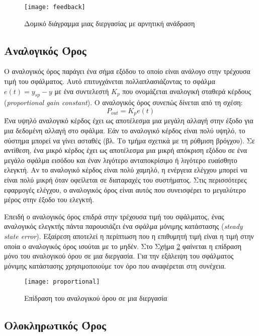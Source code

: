 \begin{figure}[h]
  \centering
  \texttt{[image: feedback]}
  \caption{Δομικό διάγραμμα μιας διεργασίας με αρνητική ανάδραση}
  \label{fig:feedback}
\end{figure}

\subsection{Αναλογικός Όρος} \label{subsec:proportional_control}

Ο αναλογικός όρος παράγει ένα σήμα εξόδου το οποίο είναι ανάλογο στην τρέχουσα τιμή του σφάλματος. Αυτό επιτυγχάνεται πολλαπλασιάζοντας το σφάλμα $e(t)=y_{sp}-y$ με ένα συντελεστή $K_p$ που ονομάζεται αναλογική σταθερά κέρδους (\emph{proportional gain constant}). Ο αναλογικός όρος συνεπώς δίνεται από τη σχέση:
\begin{equation}
P_{out}=K_p e(t)
\label{eq:p_out}
\end{equation}
Ένα υψηλό αναλογικό κέρδος έχει ως αποτέλεσμα μια μεγάλη αλλαγή στην έξοδο για μια δεδομένη αλλαγή στο σφάλμα. Εάν το αναλογικό κέρδος είναι πολύ υψηλό, το σύστημα μπορεί να γίνει ασταθές (βλ. Το τμήμα σχετικά με τη ρύθμιση βρόγχου). Σε αντίθεση, ένα μικρό κέρδος έχει ως αποτέλεσμα μια μικρή απόκριση εξόδου σε ένα μεγάλο σφάλμα εισόδου και έναν λιγότερο ανταποκρίσιμο ή λιγότερο ευαίσθητο ελεγκτή. Αν το αναλογικό κέρδος είναι πολύ χαμηλό, η ενέργεια ελέγχου μπορεί να είναι πολύ μικρή όταν οφείλεται σε διαταραχές του συστήματος. Στις περισσότερες εφαρμογές ελέγχου, ο αναλογικός όρος είναι αυτός που συνεισφέρει το μεγαλύτερο μέρος στην έξοδο του ελεγκτή.

Επειδή ο αναλογικός όρος επιδρά στην τρέχουσα τιμή του σφάλματος, ένας αναλογικός ελεγκτής πάντα παρουσιάζει ένα σφάλμα μόνιμης κατάστασης (\emph{steady state error}). Εξαίρεση αποτελεί η περίπτωση που η επιθυμητή τιμή είναι η τιμή στην οποία ο αναλογικός όρος ισούται με το μηδέν. Στο Σχήμα \ref{fig:proportional} φαίνεται η επίδραση μόνο του αναλογικού όρου σε μια διεργασία. Για την εξάλειψη του σφάλματος μόνιμης κατάστασης χρησιμοποιούμε τον όρο που αναφέρεται στη συνέχεια.

\begin{figure}[h]
  \centering
  \texttt{[image: proportional]}
  \caption{Επίδραση του αναλογικού όρου σε μια διεργασία}
  \label{fig:proportional}
\end{figure}

\subsection{Ολοκληρωτικός Όρος}

